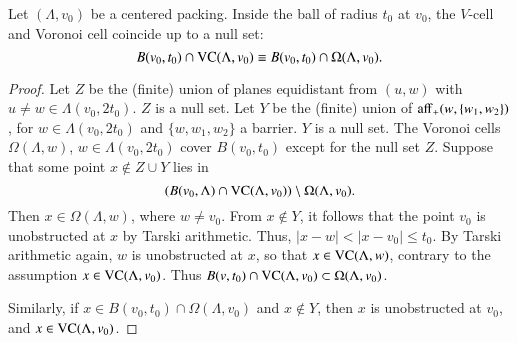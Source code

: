 \begin{lemma}
Let $(\Lambda,v_0)$ be a centered packing.
Inside the ball of radius $t_0$ at $v_0$, the $V$-cell and
Voronoi cell coincide up to a null set:
   $$B(v_0,t_0)\cap {\operatorname{VC}}(\Lambda,v_0) \equiv B(v_0,t_0)\cap \Omega(\Lambda,v_0).$$
\end{lemma}

\begin{proof} Let $Z$ be the (finite) union of planes equidistant from $(u,w)$ with $u\ne w\in \Lambda(v_0,2t_0)$.  $Z$ is a null set.  Let $Y$ be the (finite) union of ${\operatorname{aff}}_+(w,\{w_1,w_2\})$, for $w\in \Lambda(v_0,2t_0)$ and $\{w,w_1,w_2\}$ a barrier.  $Y$ is a null set.
The Voronoi cells $\Omega(\Lambda,w)$, $w\in\Lambda(v_0,2t_0)$ cover
$B(v_0,t_0)$ except for the null set $Z$.  
Suppose that some point  $x\not\in Z\cup Y$
lies in $$(B(v_0,\Lambda)\cap{\operatorname{VC}}(\Lambda,v_0) )\setminus \Omega(\Lambda,v_0).$$
Then $x\in \Omega(\Lambda,w)$, where
$w\ne v_0$.  
From $x\not\in Y$, it follows that the point $v_0$ is
unobstructed  at $x$ by Tarski arithmetic.  
Thus, $|x-w|< |x-v_0|\le t_0$.  By
Tarski arithmetic again, $w$ is unobstructed at $x$, so
that $x\in {\operatorname{VC}}(\Lambda,w)$, contrary to the assumption
$x\in{\operatorname{VC}}(\Lambda,v_0)$.  Thus $B(v,t_0)\cap{\operatorname{VC}}(\Lambda,v_0)\subset\Omega(\Lambda,v_0)$.

Similarly, if $x\in B(v_0,t_0)\cap \Omega(\Lambda,v_0)$ and $x\not\in Y$,
then $x$ is
unobstructed at $v_0$, and $x\in {\operatorname{VC}}(\Lambda,v_0)$.
\end{proof}

\bigskip

%


